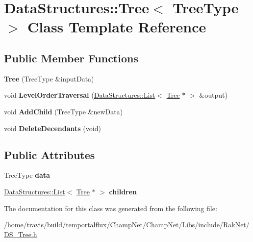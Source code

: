 \hypertarget{class_data_structures_1_1_tree}{\section{Data\-Structures\-:\-:Tree$<$ Tree\-Type $>$ Class Template Reference}
\label{class_data_structures_1_1_tree}
}
\subsection*{Public Member Functions}
\begin{DoxyCompactItemize}
\item 
\hypertarget{class_data_structures_1_1_tree_ae4fe46d6df890387aff415f12b988963}{{\bfseries Tree} (Tree\-Type \&input\-Data)}\label{class_data_structures_1_1_tree_ae4fe46d6df890387aff415f12b988963}

\item 
\hypertarget{class_data_structures_1_1_tree_a660c39c9552fad648c83967885d76f63}{void {\bfseries Level\-Order\-Traversal} (\hyperlink{class_data_structures_1_1_list}{Data\-Structures\-::\-List}$<$ \hyperlink{class_data_structures_1_1_tree}{Tree} $\ast$ $>$ \&output)}\label{class_data_structures_1_1_tree_a660c39c9552fad648c83967885d76f63}

\item 
\hypertarget{class_data_structures_1_1_tree_afc04d95eb9388294455c948b28c8a396}{void {\bfseries Add\-Child} (Tree\-Type \&new\-Data)}\label{class_data_structures_1_1_tree_afc04d95eb9388294455c948b28c8a396}

\item 
\hypertarget{class_data_structures_1_1_tree_a9c5a255e506458607a63c30e25c51281}{void {\bfseries Delete\-Decendants} (void)}\label{class_data_structures_1_1_tree_a9c5a255e506458607a63c30e25c51281}

\end{DoxyCompactItemize}
\subsection*{Public Attributes}
\begin{DoxyCompactItemize}
\item 
\hypertarget{class_data_structures_1_1_tree_aa0ddb15c34075d02357b08c917bd4196}{Tree\-Type {\bfseries data}}\label{class_data_structures_1_1_tree_aa0ddb15c34075d02357b08c917bd4196}

\item 
\hypertarget{class_data_structures_1_1_tree_a13b78d683620e94033d89fa950f4bda6}{\hyperlink{class_data_structures_1_1_list}{Data\-Structures\-::\-List}$<$ \hyperlink{class_data_structures_1_1_tree}{Tree} $\ast$ $>$ {\bfseries children}}\label{class_data_structures_1_1_tree_a13b78d683620e94033d89fa950f4bda6}

\end{DoxyCompactItemize}


The documentation for this class was generated from the following file\-:\begin{DoxyCompactItemize}
\item 
/home/travis/build/temportalflux/\-Champ\-Net/\-Champ\-Net/\-Libs/include/\-Rak\-Net/\hyperlink{_d_s___tree_8h}{D\-S\-\_\-\-Tree.\-h}\end{DoxyCompactItemize}
